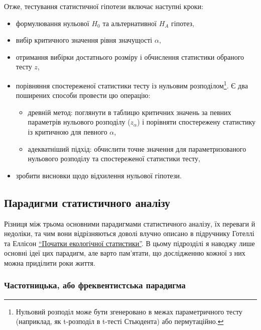 \documentclass[
  11pt,
]{book}
\begin{document}
Отже, тестування статистичної гіпотези включає наступні кроки:

\begin{itemize}
\item
  формулювання нульової \(H_0\) та альтернативної \(H_A\) гіпотез,
\item
  вибір критичного значення рівня значущості \(\alpha\),
\item
  отримання вибірки достатнього розміру і обчислення статистики обраного тесту \(z\),
\item
  порівняння спостереженої статистики тесту із нульовим розподілом\footnote{Нульовий розподіл може бути згенеровано в межах параметричного тесту (наприклад, як t-розподіл в t-тесті Стьюдента) або пермутаційно.}. Є два поширених способи провести цю операцію:

  \begin{itemize}
  \item
    древній метод: поглянути в таблицю критичних значень за певних параметрів нульового розподілу (\(z_{\alpha}\)) і порівняти спостережену статистику із критичною для певного \(\alpha\),
  \item
    адекватніший підхід: обчислити точне значення для параметризованого нульового розподілу та спостереженої статистики тесту,
  \end{itemize}
\item
  зробити висновки щодо відхилення нульової гіпотези.
\end{itemize}

\subsection{Парадигми статистичного аналізу}\label{paradigms}

Різниця між трьома основними парадигмами статистичного аналізу, їх переваги й недоліки, та чим вони відрізняються доволі влучно описано в підручнику Готеллі та Еллісон \href{https://learninglink.oup.com/access/gotelli-a-primer-of-ecological-statistics-2e}{``Початки екологічної статистики''}. В цьому підрозділі я наводжу лише основні ідеї цих парадигм, але варто пам'ятати, що дослідженню кожної з них можна приділити роки життя.

\subsubsection{Частотницька, або фреквентистська парадигма}\label{ux447ux430ux441ux442ux43eux442ux43dux438ux446ux44cux43aux430-ux430ux431ux43e-ux444ux440ux435ux43aux432ux435ux43dux442ux438ux441ux442ux441ux44cux43aux430-ux43fux430ux440ux430ux434ux438ux433ux43cux430}
\end{document}
